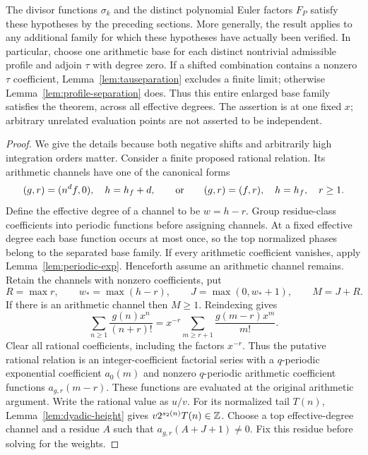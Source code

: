 The divisor functions $\sigma_k$ and the distinct polynomial Euler factors
$F_P$ satisfy these hypotheses by the preceding sections.  More generally,
the result applies to any additional family for which these hypotheses have
actually been verified. In particular, choose one arithmetic base
for each distinct nontrivial admissible profile and adjoin $\tau$ with
degree zero. If a shifted combination contains a nonzero $\tau$
coefficient, Lemma~\ref{lem:tauseparation} excludes a finite limit;
otherwise Lemma~\ref{lem:profile-separation} does. Thus this entire
enlarged base family satisfies the theorem, across all effective degrees.
The assertion is at one fixed $x$; arbitrary unrelated evaluation
points are not asserted to be independent.

\begin{proof}
We give the details because both negative shifts and arbitrarily high
integration orders matter.  Consider a finite proposed rational relation.
Its arithmetic channels have one of the canonical forms
\[
 (g,r)=(n^d f,0),\quad h=h_f+d,
 \qquad\hbox{or}\qquad
 (g,r)=(f,r),\quad h=h_f,\quad r\geq1.
\]
Define the effective degree of a channel to be $w=h-r$.
Group residue-class coefficients into periodic functions before assigning
channels. At a fixed effective degree each base function occurs at most
once, so the top normalized phases belong to the separated base family.
If every arithmetic coefficient vanishes, apply
Lemma~\ref{lem:periodic-exp}. Henceforth assume an arithmetic channel remains.
Retain the channels with nonzero coefficients, put
\[
 R=\max r,\qquad w_* = \max(h-r),\qquad
 J=\max(0,w_*+1),\qquad M=J+R.
\]
If there is an arithmetic channel then $M\geq1$.
Reindexing gives
\[
 \sum_{n\geq1}\frac{g(n)x^n}{(n+r)!}
 =x^{-r}\sum_{m\geq r+1}\frac{g(m-r)x^m}{m!}.
\]
Clear all rational coefficients, including the factors $x^{-r}$.
Thus the putative rational relation is an integer-coefficient factorial
series with a $q$-periodic exponential coefficient $a_0(m)$ and
nonzero $q$-periodic arithmetic coefficient functions $a_{g,r}(m-r)$.
These functions are evaluated at the original arithmetic argument.
Write the rational value as $u/v$.
For its normalized tail $T(n)$, Lemma~\ref{lem:dyadic-height} gives
$v2^{s_2(n)}T(n)\in\mathbb Z$.
Choose a top effective-degree channel and a residue $A$ such that
$a_{g,r}(A+J+1)\ne0$. Fix this residue before solving for the weights.


\end{proof}
